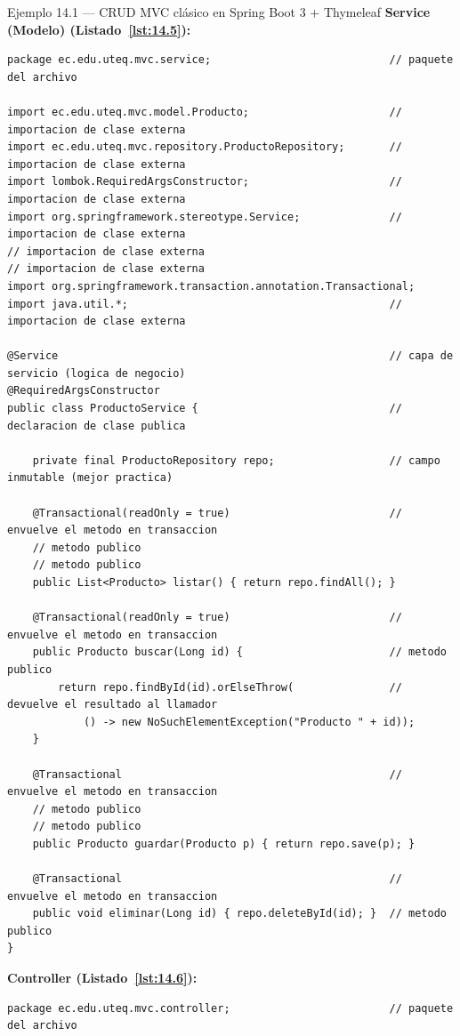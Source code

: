 \documentclass[11pt,a4paper,openany]{book}
\begin{document}
\begin{cajaejemplo}{Ejemplo 14.1 --- CRUD MVC clásico en Spring Boot 3 + Thymeleaf}
\textbf{Service (Modelo) (Listado~\ref{lst:14.5}):}
\begin{lstlisting}[style=java,caption={ProductoService.java},label=lst:14.5]
package ec.edu.uteq.mvc.service;                            // paquete del archivo

import ec.edu.uteq.mvc.model.Producto;                      // importacion de clase externa
import ec.edu.uteq.mvc.repository.ProductoRepository;       // importacion de clase externa
import lombok.RequiredArgsConstructor;                      // importacion de clase externa
import org.springframework.stereotype.Service;              // importacion de clase externa
// importacion de clase externa
// importacion de clase externa
import org.springframework.transaction.annotation.Transactional;
import java.util.*;                                         // importacion de clase externa

@Service                                                    // capa de servicio (logica de negocio)
@RequiredArgsConstructor
public class ProductoService {                              // declaracion de clase publica

    private final ProductoRepository repo;                  // campo inmutable (mejor practica)

    @Transactional(readOnly = true)                         // envuelve el metodo en transaccion
    // metodo publico
    // metodo publico
    public List<Producto> listar() { return repo.findAll(); }

    @Transactional(readOnly = true)                         // envuelve el metodo en transaccion
    public Producto buscar(Long id) {                       // metodo publico
        return repo.findById(id).orElseThrow(               // devuelve el resultado al llamador
            () -> new NoSuchElementException("Producto " + id));
    }

    @Transactional                                          // envuelve el metodo en transaccion
    // metodo publico
    // metodo publico
    public Producto guardar(Producto p) { return repo.save(p); }

    @Transactional                                          // envuelve el metodo en transaccion
    public void eliminar(Long id) { repo.deleteById(id); }  // metodo publico
}
\end{lstlisting}

\textbf{Controller (Listado~\ref{lst:14.6}):}
\begin{lstlisting}[style=java,caption={ProductoController.java},label=lst:14.6]
package ec.edu.uteq.mvc.controller;                         // paquete del archivo


\end{lstlisting}
\end{cajaejemplo}
\end{document}
